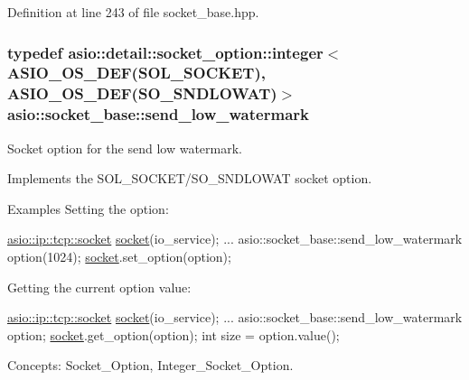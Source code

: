 Definition at line 243 of file socket\+\_\+base.\+hpp.

\hypertarget{classasio_1_1socket__base_ac6dce7c293671df85757eeed300d4209}{}
\subsubsection[{send\+\_\+low\+\_\+watermark}]{\setlength{\rightskip}{0pt plus 5cm}typedef {\bf asio\+::detail\+::socket\+\_\+option\+::integer}$<$ {\bf A\+S\+I\+O\+\_\+\+O\+S\+\_\+\+D\+E\+F}(S\+O\+L\+\_\+\+S\+O\+C\+K\+E\+T), {\bf A\+S\+I\+O\+\_\+\+O\+S\+\_\+\+D\+E\+F}(S\+O\+\_\+\+S\+N\+D\+L\+O\+W\+A\+T)$>$ {\bf asio\+::socket\+\_\+base\+::send\+\_\+low\+\_\+watermark}}\label{classasio_1_1socket__base_ac6dce7c293671df85757eeed300d4209}


Socket option for the send low watermark. 

Implements the S\+O\+L\+\_\+\+S\+O\+C\+K\+E\+T/\+S\+O\+\_\+\+S\+N\+D\+L\+O\+W\+A\+T socket option.

\begin{DoxyParagraph}{Examples}
Setting the option\+: 
\begin{DoxyCode}
\hyperlink{classasio_1_1basic__stream__socket}{asio::ip::tcp::socket} \hyperlink{namespacewebsocketpp_1_1transport_1_1asio_1_1socket_1_1error_a828ddaa5ed63a761e1b557465a35f05aa0c31b356014843e1d09514e794a539a7}{socket}(io\_service); 
...
asio::socket\_base::send\_low\_watermark option(1024);
\hyperlink{namespacewebsocketpp_1_1transport_1_1asio_1_1socket_1_1error_a828ddaa5ed63a761e1b557465a35f05aa0c31b356014843e1d09514e794a539a7}{socket}.set\_option(option);
\end{DoxyCode}

\end{DoxyParagraph}
\begin{DoxyParagraph}{}
Getting the current option value\+: 
\begin{DoxyCode}
\hyperlink{classasio_1_1basic__stream__socket}{asio::ip::tcp::socket} \hyperlink{namespacewebsocketpp_1_1transport_1_1asio_1_1socket_1_1error_a828ddaa5ed63a761e1b557465a35f05aa0c31b356014843e1d09514e794a539a7}{socket}(io\_service); 
...
asio::socket\_base::send\_low\_watermark option;
\hyperlink{namespacewebsocketpp_1_1transport_1_1asio_1_1socket_1_1error_a828ddaa5ed63a761e1b557465a35f05aa0c31b356014843e1d09514e794a539a7}{socket}.get\_option(option);
\textcolor{keywordtype}{int} size = option.value();
\end{DoxyCode}

\end{DoxyParagraph}
\begin{DoxyParagraph}{Concepts\+:}
Socket\+\_\+\+Option, Integer\+\_\+\+Socket\+\_\+\+Option. 
\end{DoxyParagraph}


